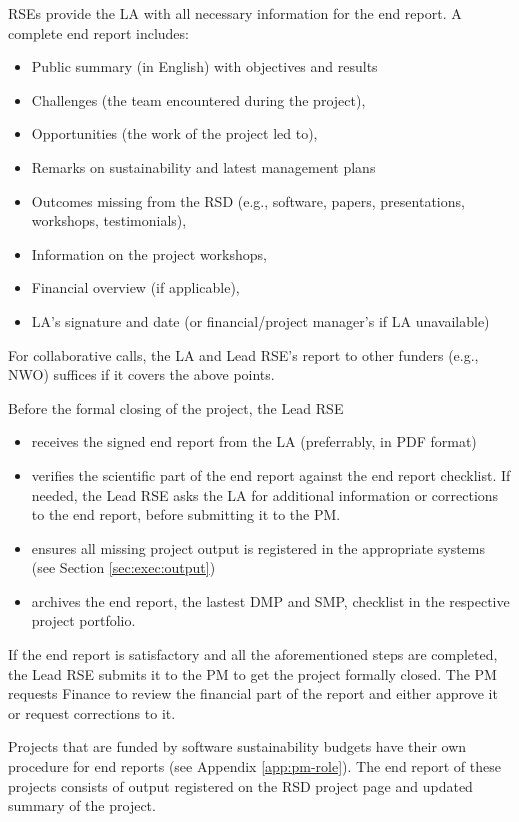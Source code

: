 RSEs provide the LA with all necessary information for the end report.%
A complete end report includes:
\begin{itemize}
\item Public summary (in English) with objectives and results
\item Challenges (the team encountered during the project),
\item Opportunities (the work of the project led to),
\item Remarks on sustainability and latest management plans
\item Outcomes missing from the RSD (e.g., software, papers, presentations, workshops, testimonials),
\item Information on the project workshops,
\item Financial overview (if applicable),
\item LA's signature and date (or financial/project manager's if LA unavailable)
\end{itemize}
For collaborative calls, the LA and Lead RSE's report to other funders (e.g., NWO) suffices if it covers the above points.

Before the formal closing of the project, the Lead RSE 
\begin{itemize}
   \item receives the signed end report from the LA (preferrably, in PDF format)
   \item verifies the scientific part of the end report against the end report checklist. If needed, the Lead RSE asks the LA for additional information or corrections to the end report, before submitting it to the PM. 
   \item ensures all missing project output is registered in the appropriate systems (see Section \ref{sec:exec:output}) 
   \item archives the end report, the lastest DMP and SMP, checklist in the respective project portfolio.
\end{itemize}
If the end report is satisfactory and all the aforementioned steps are completed, the Lead RSE submits it to the PM to get the project formally closed. The PM requests Finance to review the financial 
part of the report and either approve it or request corrections to it. 

Projects that are funded by software sustainability budgets have their own procedure for end reports (see Appendix
\ref{app:pm-role}). The end report of these projects consists of output registered on the RSD project page and
updated summary of the project.

